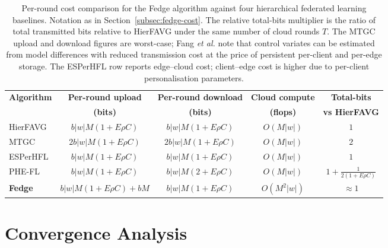 \begin{table}[!t]
\centering
\caption{Per-round cost comparison for the Fedge algorithm against four hierarchical federated learning baselines. Notation as in Section~\ref{subsec:fedge-cost}. The relative total-bits multiplier is the ratio of total transmitted bits relative to HierFAVG under the same number of cloud rounds $T$. The MTGC upload and download figures are worst-case; Fang \emph{et al.} \cite{fang2024hierarchical} note that control variates can be estimated from model differences with reduced transmission cost at the price of persistent per-client and per-edge storage. The ESPerHFL row reports edge--cloud cost; client--edge cost is higher due to per-client personalisation parameters.}
\label{tab:fedge-cost}
\renewcommand{\arraystretch}{1.3}
\setlength{\tabcolsep}{6pt}
\footnotesize
\begin{tabular}{l c c c c}
\toprule
\textbf{Algorithm} & \textbf{Per-round upload} & \textbf{Per-round download} & \textbf{Cloud compute} & \textbf{Total-bits} \\
                   & \textbf{(bits)}            & \textbf{(bits)}              & \textbf{(flops)}        & \textbf{vs HierFAVG} \\
\midrule
HierFAVG \cite{liu2020hierfavg} &
$b |w| M (1 + E \rho C)$ &
$b |w| M (1 + E \rho C)$ &
$O(M |w|)$ &
$1$ \\
MTGC \cite{fang2024hierarchical} &
$2 b |w| M (1 + E \rho C)$ &
$2 b |w| M (1 + E \rho C)$ &
$O(M |w|)$ &
$2$ \\
ESPerHFL \cite{ma2024personalized} &
$b |w| M (1 + E \rho C)$ &
$b |w| M (1 + E \rho C)$ &
$O(M |w|)$ &
$1$ \\
PHE-FL \cite{lee2025phefl} &
$b |w| M (1 + E \rho C)$ &
$b |w| M (2 + E \rho C)$ &
$O(M |w|)$ &
$1 + \tfrac{1}{2(1 + E \rho C)}$ \\
\textbf{Fedge} &
$b |w| M (1 + E \rho C) + bM$ &
$b |w| M (1 + E \rho C)$ &
$O(M^{2} |w|)$ &
$\approx 1$ \\
\bottomrule
\end{tabular}
\end{table}

\section{Convergence Analysis}
\label{sec:fedge-convergence}

